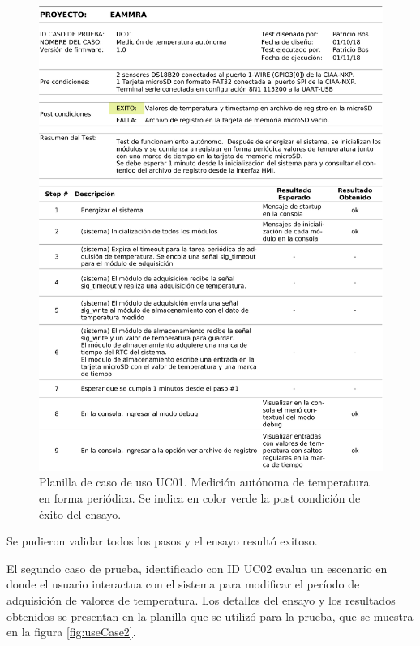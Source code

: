 \begin{figure}[!htb]
	\centering
	\includegraphics[width=1\textwidth]{./Figures/UseCase1_recortada.pdf}
	\caption{Planilla de caso de uso UC01. Medición autónoma de temperatura en forma periódica. Se indica en color verde la post condición de éxito del ensayo.}
	\label{fig:useCase1}
\end{figure}

Se pudieron validar todos los pasos y el ensayo resultó exitoso.

El segundo caso de prueba, identificado con ID UC02 evalua un escenario en donde el usuario interactua con el sistema para modificar el período de adquisición de valores de temperatura.  Los detalles del ensayo y los resultados obtenidos se presentan en la planilla que se utilizó para la prueba, que se muestra en la figura \ref{fig:useCase2}. 

\vspace{10px}

